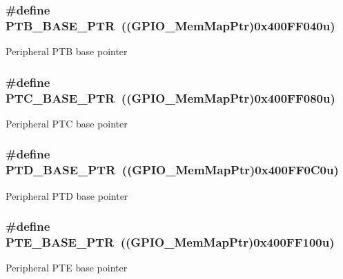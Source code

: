 \subsubsection[{P\+T\+B\+\_\+\+B\+A\+S\+E\+\_\+\+P\+T\+R}]{\setlength{\rightskip}{0pt plus 5cm}\#define P\+T\+B\+\_\+\+B\+A\+S\+E\+\_\+\+P\+T\+R~(({\bf G\+P\+I\+O\+\_\+\+Mem\+Map\+Ptr})0x400\+F\+F040u)}\label{group___g_p_i_o___peripheral_ga59ab0f28e891ea28f152505ce2021747}
Peripheral P\+T\+B base pointer \hypertarget{group___g_p_i_o___peripheral_gaaa3dc05c2a51a960067e1de6863fd3dd}{}
\subsubsection[{P\+T\+C\+\_\+\+B\+A\+S\+E\+\_\+\+P\+T\+R}]{\setlength{\rightskip}{0pt plus 5cm}\#define P\+T\+C\+\_\+\+B\+A\+S\+E\+\_\+\+P\+T\+R~(({\bf G\+P\+I\+O\+\_\+\+Mem\+Map\+Ptr})0x400\+F\+F080u)}\label{group___g_p_i_o___peripheral_gaaa3dc05c2a51a960067e1de6863fd3dd}
Peripheral P\+T\+C base pointer \hypertarget{group___g_p_i_o___peripheral_gaa61d2c33375f3becbae1353eee4c1317}{}
\subsubsection[{P\+T\+D\+\_\+\+B\+A\+S\+E\+\_\+\+P\+T\+R}]{\setlength{\rightskip}{0pt plus 5cm}\#define P\+T\+D\+\_\+\+B\+A\+S\+E\+\_\+\+P\+T\+R~(({\bf G\+P\+I\+O\+\_\+\+Mem\+Map\+Ptr})0x400\+F\+F0\+C0u)}\label{group___g_p_i_o___peripheral_gaa61d2c33375f3becbae1353eee4c1317}
Peripheral P\+T\+D base pointer \hypertarget{group___g_p_i_o___peripheral_gaa230685f72ad1540850ab8d12366775c}{}
\subsubsection[{P\+T\+E\+\_\+\+B\+A\+S\+E\+\_\+\+P\+T\+R}]{\setlength{\rightskip}{0pt plus 5cm}\#define P\+T\+E\+\_\+\+B\+A\+S\+E\+\_\+\+P\+T\+R~(({\bf G\+P\+I\+O\+\_\+\+Mem\+Map\+Ptr})0x400\+F\+F100u)}\label{group___g_p_i_o___peripheral_gaa230685f72ad1540850ab8d12366775c}
Peripheral P\+T\+E base pointer 

